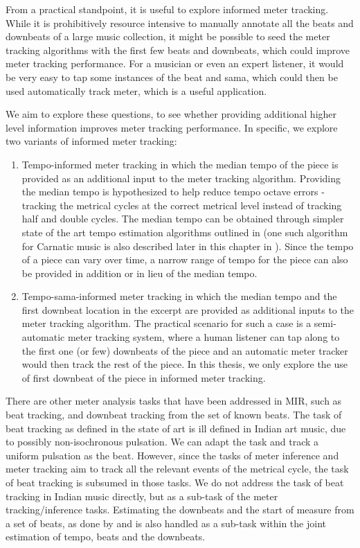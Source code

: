 From a practical standpoint, it is useful to explore informed meter tracking. While it is prohibitively resource intensive to manually annotate all the beats and downbeats of a large music collection, it might be possible to seed the meter tracking algorithms with the first few beats and downbeats, which could improve meter tracking performance. For a musician or even an expert listener, it would be very easy to tap some instances of the beat and \gls{sama}, which could then be used automatically track meter, which is a useful application. 

We aim to explore these questions, to see whether providing additional higher level information improves meter tracking performance. In specific, we explore two variants of informed meter tracking: 
\begin{enumerate}[leftmargin=*]
    \item Tempo-informed meter tracking in which the median tempo of the piece is provided as an additional input to the meter tracking algorithm. Providing the median tempo is hypothesized to help reduce tempo octave errors - tracking the metrical cycles at the correct metrical level instead of tracking half and double cycles. The median tempo can be obtained through simpler state of the art tempo estimation algorithms outlined in  (one such algorithm for Carnatic music is also described later in this chapter in ). Since the tempo of a piece can vary over time, a narrow range of tempo for the piece can also be provided in addition or in lieu of the median tempo. 
    \item Tempo-sama-informed meter tracking in which the median tempo and the first downbeat location in the excerpt are provided as additional inputs to the meter tracking algorithm. The practical scenario for such a case is a semi-automatic meter tracking system, where a human listener can tap along to the first one (or few) downbeats of the piece and an automatic meter tracker would then track the rest of the piece. In this thesis, we only explore the use of first downbeat of the piece in informed meter tracking.
\end{enumerate}
% 
There are other meter analysis tasks that have been addressed in \gls{MIR}, such as beat tracking, and downbeat tracking from the set of known beats. The task of beat tracking as defined in the state of art is ill defined in Indian art music, due to possibly non-isochronous pulsation. We can adapt the task and track a uniform pulsation as the beat. However, since the tasks of meter inference and meter tracking aim to track all the relevant events of the metrical cycle, the task of beat tracking is subsumed in those tasks. We do not address the task of beat tracking in Indian music directly, but as a sub-task of the meter tracking/inference tasks. Estimating the downbeats and the start of measure from a set of beats, as done by  and  is also handled as a sub-task within the joint estimation of tempo, beats and the downbeats. 

